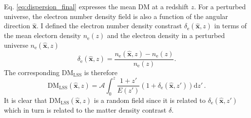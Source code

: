 Eq. \ref{eq:dispersion_final} expresses the mean DM at a redshift $z$. For a perturbed universe, the electron number density field is also a function of the angular direction $\mathbf{\hat{x}}$. I defined the electron number density constrast $\delta_\mathrm{e}(\mathbf{\hat{x}}, z)$ in terms of the mean electorn density $n_\mathrm{e}(z)$ and the electron density in a perturbed universe $n_\mathrm{e}(\mathbf{\hat{x}}, z)$
\begin{equation}
    \delta_\mathrm{e}(\mathbf{\hat{x}}, z) = \frac{n_\mathrm{e}(\mathbf{\hat{x}}, z) - n_\mathrm{e}(z)}{n_\mathrm{e}(z)}.
\end{equation}
The corresponding $\mathrm{DM}_\mathrm{LSS}$ is therefore
\begin{equation}\label{eq:DM_inhomogeneous}
    \mathrm{DM}_\mathrm{LSS}(\mathbf{\hat{x}}, z) = \mathcal{A} \int_0^z \frac{1+z'}{E(z')} (1 + \delta_\mathrm{e}(\mathbf{\hat{x}}, z')) \mathrm{d}z' \, .
\end{equation}
It is clear that $\mathrm{DM}_\mathrm{LSS}(\mathbf{\hat{x}}, z)$ is a random field since it is related to $\delta_\mathrm{e}(\mathbf{\hat{x}}, z')$ which in turn is related to the matter density contrast $\delta$. 

